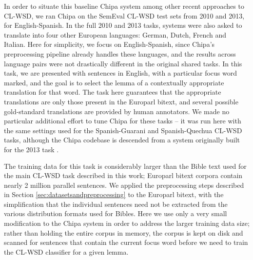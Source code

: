 In order to situate this baseline Chipa system among other recent approaches to
CL-WSD, we ran Chipa on the SemEval CL-WSD test sets from 2010 and 2013, for
English-Spanish.
In the full 2010 and 2013 tasks, systems were also asked to translate into four
other European languages: German, Dutch, French and Italian. 
Here for simplicity, we focus on English-Spanish, since Chipa's preprocessing
pipeline already handles these languages, and the results across language pairs
were not drastically different in the original shared tasks.
In this task, we are presented with sentences in English, with a particular
focus word marked, and the goal is to select the lemma of a contextually
appropriate translation for that word\cite{lefever-hoste:2010:SemEval,task10}.
The task here guarantees that the appropriate translations are only those
present in the Europarl bitext, and several possible gold-standard translations
are provided by human annotators.  We made no particular additional effort to
tune Chipa for these tasks -- it was run here with the same settings used for
the Spanish-Guarani and Spanish-Quechua CL-WSD tasks, although the Chipa
codebase is descended from a system originally built for the 2013 task
\cite{rudnick-liu-gasser:2013:SemEval-2013}.

The training data for this task is considerably larger than the Bible text used
for the main CL-WSD task described in this work; Europarl bitext corpora
contain nearly 2 million parallel sentences. We applied the preprocessing steps
described in Section \ref{sec:datasetsandpreprocessing} to the Europarl bitext,
with the simplification that the individual sentences need not be extracted
from the various distribution formats used for Bibles.
Here we use only a very small modification to the Chipa system in order to
address the larger training data size; rather than holding the entire corpus in
memory, the corpus is kept on disk and scanned for sentences that contain the
current focus word before we need to train the CL-WSD classifier for a given
lemma.

